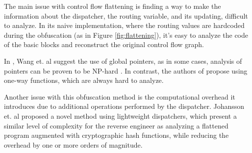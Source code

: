 \documentclass[
  digital, %
  notable,   %
  twoside, %
  nolof,     %
  nolot,     %
]{fithesis3}
\theoremstyle{definition}
\begin{document}
The main issue with control flow flattening is finding a way to make the information about the dispatcher, the routing variable, and its updating, difficult to analyze. In its naive implementation, where the routing values are hardcoded during the obfuscation (as in Figure \ref{fig:flattening}), it's easy to analyze the code of the basic blocks and reconstruct the original control flow graph. 

In \cite{wang2001protection}, Wang et. al suggest the use of global pointers, as in some cases, analysis of pointers can be proven to be NP-hard \cite{np_pointers}. In contrast, the authors of \cite{cappaert2010general} propose using one-way functions, which are always hard to analyze. 

Another issue with this obfuscation method is the computational overhead it introduces due to additional operations performed by the dispatcher. Johansson et. al \cite{johansson2017lightweight} proposed a novel method using lightweight dispatchers, which present a similar level of complexity for the reverse engineer as analyzing a flattened program augmented with cryptographic hash functions, while reducing the overhead by one or more orders of magnitude.
\end{document}
